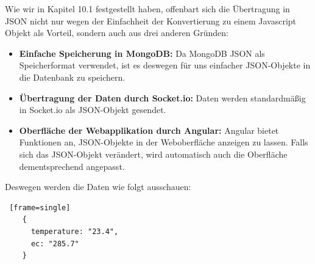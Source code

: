 \documentclass[11pt]{article}
\begin{document}
Wie wir in Kapitel 10.1 festgestellt haben, offenbart sich die \"Ubertragung in JSON nicht nur wegen der Einfachheit der Konvertierung zu einem Javascript Objekt als Vorteil, sondern auch aus drei anderen Gr\"unden:
\begin{itemize}
    \item \textbf{Einfache Speicherung in MongoDB:} Da MongoDB JSON als Speicherformat verwendet, ist es deswegen f\"ur uns einfacher JSON-Objekte in die Datenbank zu speichern.
    \item \textbf{\"Ubertragung der Daten durch Socket.io:} Daten werden standardm\"a{\ss}ig in Socket.io als JSON-Objekt gesendet.
    \item \textbf{Oberfl\"ache der Webapplikation durch Angular:} Angular bietet Funktionen an, JSON-Objekte in der Weboberfl\"ache anzeigen zu lassen. Falls sich das JSON-Objekt ver\"andert, wird automatisch auch die Oberfl\"ache dementsprechend angepasst.
\end{itemize}

Deswegen werden die Daten wie folgt ausschauen:
\begin{lstlisting} [frame=single]
	{
	  temperature: "23.4",
	  ec: "285.7"
	}
\end{lstlisting}
\newpage
\end{document}
